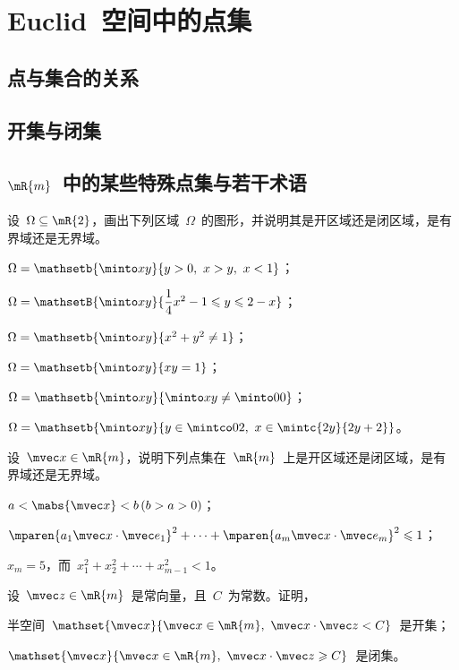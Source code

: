 \section{Euclid~空间中的点集}
\subsection{点与集合的关系}
\subsection{开集与闭集}
\subsection{$\mR{m}$~中的某些特殊点集与若干术语}
\begin{exercise}
\item 设~$\Omega\subset\mR{2}$，画出下列区域~$\Omega$~的图形，并说明其是开区域还是闭区域，是有界域还是无界域。
\begin{exlistcols}
  \item $\Omega=\mathsetb{\minto xy}{y>0,~x>y,~x<1}$；
  \item $\Omega=\mathsetB{\minto xy}{\dfrac14x^2-1\leq y\leq 2-x}$；
  \item $\Omega=\mathsetb{\minto xy}{x^2+y^2\neq1}$；
  \item $\Omega=\mathsetb{\minto xy}{xy=1}$；
  \item $\Omega=\mathsetb{\minto xy}{\minto xy\neq\minto 00}$；
  \item $\Omega=\mathsetb{\minto xy}{y\in\mintco02,~x\in\mintc{2y}{2y+2}}$。
\end{exlistcols}
\item 设~$\mvec x\in\mR{m}$，说明下列点集在~$\mR{m}$~上是开区域还是闭区域，是有界域还是无界域。
\begin{exlistcols}
  \item $a<\mabs{\mvec x}<b\mcond{b>a>0}$；
  \item $\mparen{a_1\mvec x\cdot\mvec e_{1}}^2+\dotsb+\mparen{a_m\mvec x\cdot\mvec e_{m}}^2\leq1$；
  \item $x_m=5$，而~$x_1^2+x_2^2+\dotsb+x_{m-1}^2<1$。
\end{exlistcols}
\item 设~$\mvec z\in\mR{m}$~是常向量，且~$C$~为常数。证明，
\begin{exlistcols}
  \item 半空间~$\mathset{\mvec x}{\mvec x\in\mR{m},~\mvec x\cdot\mvec z<C}$~是开集；
  \item $\mathset{\mvec x}{\mvec x\in\mR{m},~\mvec x\cdot\mvec z\geq C}$~是闭集。

\end{exlistcols}
\end{exercise}
